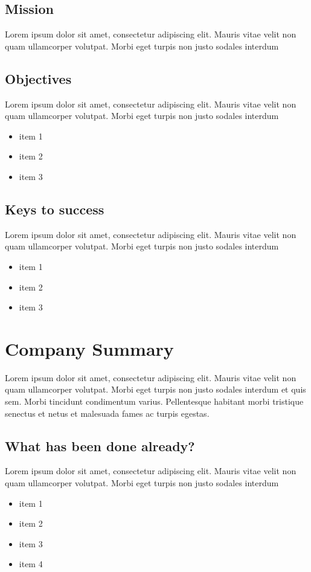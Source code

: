 \documentclass[11pt,titlepage]{article}
\begin{document}
\subsection{Mission}
Lorem ipsum dolor sit amet, consectetur adipiscing elit. Mauris vitae velit 
non quam ullamcorper volutpat. Morbi eget turpis non justo sodales interdum
\newline

\subsection{Objectives}
Lorem ipsum dolor sit amet, consectetur adipiscing elit. Mauris vitae velit 
non quam ullamcorper volutpat. Morbi eget turpis non justo sodales interdum
\newline
\begin{itemize}
\item item 1
\item item 2
\item item 3
\end{itemize}

\subsection{Keys to success}
Lorem ipsum dolor sit amet, consectetur adipiscing elit. Mauris vitae velit 
non quam ullamcorper volutpat. Morbi eget turpis non justo sodales interdum
\newline
\begin{itemize}
\item item 1
\item item 2
\item item 3
\end{itemize}

\section{Company Summary}
Lorem ipsum dolor sit amet, consectetur adipiscing elit. Mauris vitae velit 
non quam ullamcorper volutpat. Morbi eget turpis non justo sodales interdum 
et quis sem. Morbi tincidunt condimentum varius. Pellentesque habitant morbi 
tristique senectus et netus et malesuada fames ac turpis egestas.\newline

\subsection{What has been done already?}
Lorem ipsum dolor sit amet, consectetur adipiscing elit. Mauris vitae velit 
non quam ullamcorper volutpat. Morbi eget turpis non justo sodales interdum
\newline
\begin{itemize}
\item item 1
\item item 2
\item item 3
\item item 4
\end{itemize}
\end{document}
